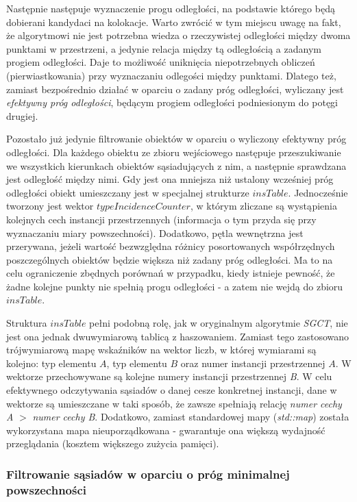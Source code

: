 \documentclass[12pt]{article}
\newcounter{algorytm}
\begin{document}
Następnie następuje wyznaczenie progu odległości, na podstawie którego będą dobierani kandydaci na kolokacje. Warto zwrócić w tym miejscu uwagę na fakt, że algorytmowi nie jest potrzebna wiedza o rzeczywistej odległości między dwoma punktami w przestrzeni, a jedynie relacja między tą odległością a zadanym progiem odległości. Daje to możliwość uniknięcia niepotrzebnych obliczeń (pierwiastkowania) przy wyznaczaniu odlegości między punktami. Dlatego też, zamiast bezpośrednio działać w oparciu o zadany próg odległości, wyliczany jest \textit{efektywny próg odległości}, będącym progiem odległości podniesionym do potęgi drugiej. 

Pozostało już jedynie filtrowanie obiektów w oparciu o wyliczony efektywny próg odległości. Dla każdego obiektu ze zbioru wejściowego następuje przeszukiwanie we wszystkich kierunkach obiektów sąsiadujących z nim, a następnie sprawdzana jest odległość między nimi. Gdy jest ona mniejsza niż ustalony wcześniej próg odległości obiekt umieszczany jest w specjalnej strukturze $ insTable $. Jednocześnie tworzony jest wektor $ typeIncidenceCounter$, w którym zliczane są wystąpienia kolejnych cech instancji przestrzennych (informacja o tym przyda się przy wyznaczaniu miary powszechności). Dodatkowo, pętla wewnętrzna jest przerywana, jeżeli wartość bezwzględna różnicy posortowanych współrzędnych poszczególnych obiektów będzie większa niż zadany próg odległości. Ma to na celu ograniczenie zbędnych porównań w przypadku, kiedy istnieje pewność, że żadne kolejne punkty nie spełnią progu odległości - a zatem nie wejdą do zbioru $ insTable $.
 
Struktura $ insTable $ pełni podobną rolę, jak w oryginalnym algorytmie \textit{SGCT}, nie jest ona jednak dwuwymiarową tablicą z haszowaniem. Zamiast tego zastosowano trójwymiarową mapę wskaźników na wektor liczb, w której wymiarami są kolejno: typ elementu $ A $, typ elementu $ B $ oraz numer instancji przestrzennej $ A $.  W wektorze przechowywane są kolejne numery instancji przestrzennej \textit{B}. W celu efektywnego odczytywania sąsiadów o danej cesze konkretnej instancji, dane w wektorze są umieszczane w taki sposób, że zawsze spełniają relację \textit{numer cechy A} $ > $ \textit{numer cechy B}. Dodatkowo, zamiast standardowej mapy (\textit{std::map}) została wykorzystana mapa nieuporządkowana - gwarantuje ona większą wydajność przeglądania (kosztem większego zużycia pamięci).

\subsubsection{Filtrowanie sąsiadów w oparciu o próg minimalnej powszechności}
\end{document}
